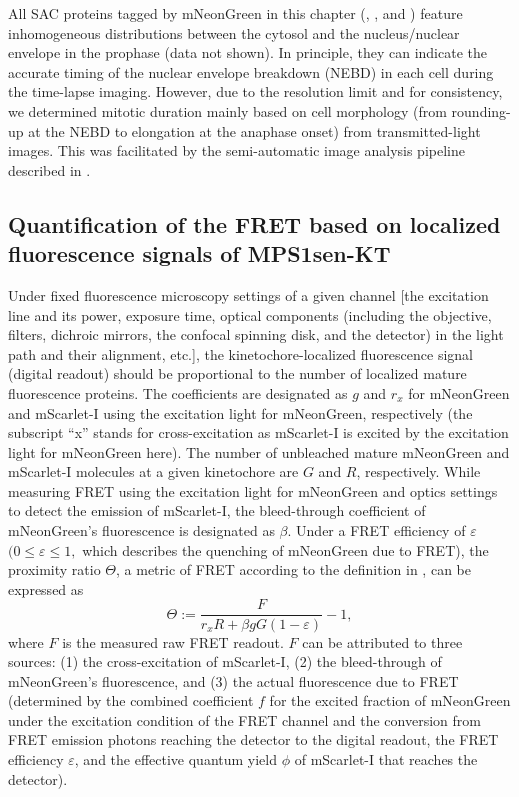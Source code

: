 All SAC proteins tagged by mNeonGreen in this chapter (, , and ) feature inhomogeneous distributions between the cytosol and the nucleus/nuclear envelope in the prophase (data not shown). In principle, they can indicate the accurate timing of the nuclear envelope breakdown (NEBD) in each cell during the time-lapse imaging. However, due to the resolution limit and for consistency, we determined mitotic duration mainly based on cell morphology (from rounding-up at the NEBD to elongation at the anaphase onset) from transmitted-light images. This was facilitated by the semi-automatic image analysis pipeline described in . %

\subsection{Quantification of the FRET based on localized fluorescence signals of MPS1sen-KT}
\label{FRETMetricTheory}
Under fixed fluorescence microscopy settings of a given channel [the excitation line and its power, exposure time, optical components (including the objective, filters, dichroic mirrors, the confocal spinning disk, and the detector) in the light path and their alignment, etc.], the kinetochore-localized fluorescence signal (digital readout) should be proportional to the number of localized mature fluorescence proteins. The coefficients are designated as $g$ and $r_x$ for mNeonGreen and mScarlet-I using the excitation light for mNeonGreen, respectively (the subscript ``x'' stands for cross-excitation 
as mScarlet-I is excited by the excitation light for mNeonGreen here). The number of unbleached mature mNeonGreen and mScarlet-I molecules at a given kinetochore are $G$ and $R$, respectively. While measuring FRET using the excitation light for mNeonGreen and optics settings to detect the emission of mScarlet-I, the bleed-through coefficient of mNeonGreen's fluorescence is designated as $\beta$. Under a FRET efficiency of $\varepsilon$ $(0 \leq \varepsilon \leq 1,$ which describes the quenching of mNeonGreen due to FRET), the proximity ratio $\Theta$, a metric of FRET according to the definition in \cite{HeLaFRETGUI}, can be expressed as
\begin{equation*}
    \Theta := \dfrac{F}{r_xR + \beta gG(1 - \varepsilon)} - 1,
\end{equation*}
where $F$ is the measured raw FRET readout. $F$ can be attributed to three sources: (1) the cross-excitation of mScarlet-I, (2) the bleed-through of mNeonGreen's fluorescence, and (3) the actual fluorescence due to FRET (determined by the combined coefficient $f$ for the excited fraction of mNeonGreen under the excitation condition of the FRET channel and the conversion from FRET emission photons reaching the detector to the digital readout, the FRET efficiency $\varepsilon$, and the effective quantum yield $\phi$ of mScarlet-I that reaches the detector).
